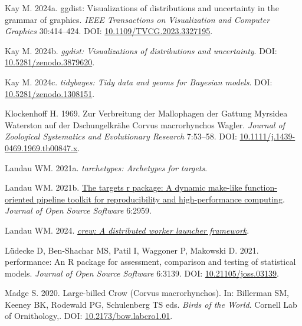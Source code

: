 \documentclass[10pt,a4paper]{article}
\newlength{\cslhangindent}
\newenvironment{CSLReferences}[2] %
 {\begin{list}{}{%
  \setlength{\itemindent}{0pt}
  \setlength{\leftmargin}{0pt}
  \setlength{\parsep}{0pt}
  \ifodd #1
   \setlength{\leftmargin}{\cslhangindent}
   \setlength{\itemindent}{-1\cslhangindent}
  \fi
  \setlength{\itemsep}{#2\baselineskip}}}
 {\end{list}}
\begin{document}
\begin{CSLReferences}{1}{0}
Kay M. 2024a. {ggdist}: Visualizations of distributions and uncertainty in the grammar of graphics. \emph{IEEE Transactions on Visualization and Computer Graphics} 30:414--424. DOI: \href{https://doi.org/10.1109/TVCG.2023.3327195}{10.1109/TVCG.2023.3327195}.

Kay M. 2024b. \emph{{ggdist}: Visualizations of distributions and uncertainty}. DOI: \href{https://doi.org/10.5281/zenodo.3879620}{10.5281/zenodo.3879620}.

Kay M. 2024c. \emph{{tidybayes}: Tidy data and geoms for {Bayesian} models}. DOI: \href{https://doi.org/10.5281/zenodo.1308151}{10.5281/zenodo.1308151}.

Klockenhoff H. 1969. Zur {Verbreitung} der {Mallophagen} der {Gattung} {Myrsidea} {Waterston} auf der {Dschungelkrähe} {Corvus} macrorhynchos {Wagler}. \emph{Journal of Zoological Systematics and Evolutionary Research} 7:53--58. DOI: \href{https://doi.org/10.1111/j.1439-0469.1969.tb00847.x}{10.1111/j.1439-0469.1969.tb00847.x}.

Landau WM. 2021a. \emph{{tarchetypes}: Archetypes for targets}.

Landau WM. 2021b. \href{https://doi.org/10.21105/joss.02959}{The targets r package: A dynamic make-like function-oriented pipeline toolkit for reproducibility and high-performance computing}. \emph{Journal of Open Source Software} 6:2959.

Landau WM. 2024. \emph{\href{https://CRAN.R-project.org/package=crew}{{crew}: A distributed worker launcher framework}}.

Lüdecke D, Ben-Shachar MS, Patil I, Waggoner P, Makowski D. 2021. {performance}: An {R} package for assessment, comparison and testing of statistical models. \emph{Journal of Open Source Software} 6:3139. DOI: \href{https://doi.org/10.21105/joss.03139}{10.21105/joss.03139}.

Madge S. 2020. Large-billed {Crow} ({Corvus} macrorhynchos). In: Billerman SM, Keeney BK, Rodewald PG, Schulenberg TS eds. \emph{Birds of the {World}}. Cornell Lab of Ornithology,. DOI: \href{https://doi.org/10.2173/bow.labcro1.01}{10.2173/bow.labcro1.01}.


\end{CSLReferences}
\end{document}
